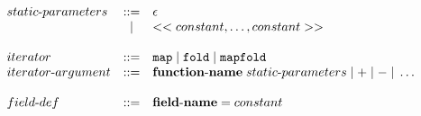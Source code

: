 \documentclass[a4paper]{article}
\newcommand{\p}[0]{\; \vert \;}
\newcommand{\Coloneqq}[0]{::=}
\begin{document}
\[\begin{array}{lcl}
  \\

  static\sdash{}parameters & \Coloneqq & \epsilon \\
  & | & \piquots{constant,\dots,constant} \\

  \\

  iterator & \Coloneqq & \mathtt{map} \p \mathtt{fold} \p \mathtt{mapfold} \\
  iterator\sdash{}argument & \Coloneqq &
    {\bf function\sdash{}name} \; static\sdash{}parameters
    \p \mathtt{+} \p \mathtt{-} \p \dots \\

  \\

  field\sdash{}def & \Coloneqq & {\bf field\sdash{}name} = constant
\end{array}
\]

\newcommand{\funo}{fun\sdash{}or\sdash{}node}
\end{document}
